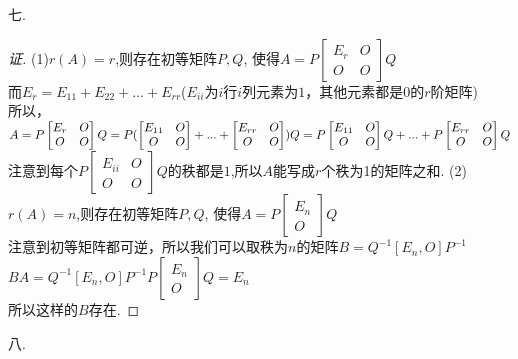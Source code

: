 \documentclass[10pt,a4paper]{report}
\begin{document}
\noindent 七.
\begin{proof}[证]
	(1)$r(A)=r$,则存在初等矩阵$P, Q$, 使得$A = P\left[
	\begin{matrix}
	E_{r} & O\\
	O & O
	\end{matrix}
	\right]Q$\\
	而$E_{r} = E_{11}+E_{22}+...+E_{rr}$($E_{ii}$为$i$行$i$列元素为$1$，其他元素都是$0$的$r$阶矩阵)\\
	所以，$A=P\left[
	\begin{matrix}
	E_{r} & O\\
	O & O
	\end{matrix}
	\right]Q = P(\left[
	\begin{matrix}
	E_{11} & O\\
	O & O
	\end{matrix}
	\right] + ...+ \left[
	\begin{matrix}
	E_{rr} & O\\
	O & O
	\end{matrix}
	\right])Q\\
	=P\left[
	\begin{matrix}
	E_{11} & O\\
	O & O
	\end{matrix}
	\right]Q + ...+ P\left[
	\begin{matrix}
	E_{rr} & O\\
	O & O
	\end{matrix}
	\right]Q$\\
	注意到每个$P\left[
	\begin{matrix}
	E_{ii} & O\\
	O & O
	\end{matrix}
	\right]Q$的秩都是$1$,所以$A$能写成$r$个秩为1的矩阵之和.
	(2)$r(A)=n$,则存在初等矩阵$P, Q$, 使得$A = P\left[
	\begin{matrix}
	E_{n}\\
	O
	\end{matrix}
	\right]Q$\\
	注意到初等矩阵都可逆，所以我们可以取秩为$n$的矩阵$B = Q^{-1}[E_{n}, O]P^{-1}$\\
	$BA = Q^{-1}[E_{n}, O]P^{-1}P\left[
	\begin{matrix}
	E_{n}\\
	O
	\end{matrix}
	\right]Q = E_{n}$\\
	所以这样的$B$存在.
\end{proof}
\noindent 八.
\end{document}
